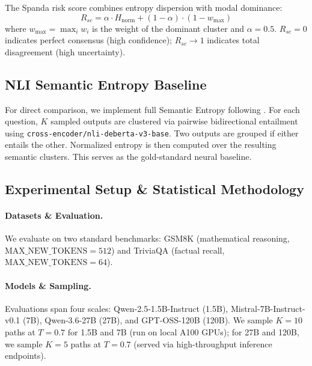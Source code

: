 \documentclass[11pt]{article}
\begin{document}
The Spanda risk score combines entropy dispersion with modal dominance:
\begin{equation}
    R_{sc} = \alpha \cdot H_{\text{norm}} + (1 - \alpha) \cdot (1 - w_{\max})
\end{equation}
where $w_{\max} = \max_i w_i$ is the weight of the dominant cluster and $\alpha = 0.5$. $R_{sc} = 0$ indicates perfect consensus (high confidence); $R_{sc} \to 1$ indicates total disagreement (high uncertainty).

\subsection{NLI Semantic Entropy Baseline}

For direct comparison, we implement full Semantic Entropy following \cite{kuhn2023semantic}. For each question, $K$ sampled outputs are clustered via pairwise bidirectional entailment using \texttt{cross-encoder/nli-deberta-v3-base}. Two outputs are grouped if either entails the other. Normalized entropy is then computed over the resulting semantic clusters. This serves as the gold-standard neural baseline.

\subsection{Experimental Setup \& Statistical Methodology}

\paragraph{Datasets \& Evaluation.} We evaluate on two standard benchmarks: GSM8K \cite{cobbe2021training} (mathematical reasoning, $\text{MAX\_NEW\_TOKENS} = 512$) and TriviaQA \cite{joshi2017triviaqa} (factual recall, $\text{MAX\_NEW\_TOKENS} = 64$).
\paragraph{Models \& Sampling.} Evaluations span four scales: Qwen-2.5-1.5B-Instruct (1.5B), Mistral-7B-Instruct-v0.1 (7B), Qwen-3.6-27B (27B), and GPT-OSS-120B (120B). We sample $K = 10$ paths at $T = 0.7$ for 1.5B and 7B (run on local A100 GPUs); for 27B and 120B, we sample $K = 5$ paths at $T = 0.7$ (served via high-throughput inference endpoints).
\end{document}
